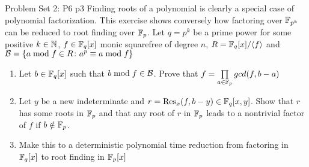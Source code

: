 \documentclass[a4paper, 11pt]{article}
\begin{document}
\begin{problem}{%
		Problem Set 2: P6
	}{p3%
	}
	Finding roots of a polynomial is clearly a special case of polynomial factorization. This exercise
	shows conversely how factoring over $\mathbb{F}_{p^k}$ can be reduced to root finding over $\mathbb{F}_p$. Let $q=p^k$ be a prime power for some positive $k\in \mathbb{N}$, $f\in \mathbb{F}_q[x]$ monic squarefree of degree $n$, $R=\mathbb{F}_q[x]/\langle f\rangle$ and $\mathcal{B}=\{a\bmod f\in R\colon a^p\equiv a\bmod f\}$
	\begin{enumerate}[label=(\alph*)]
		\item Let $b\in \mathbb{F}_q[x]$ such that $b\bmod f\in\mathcal{B}$. Prove that $f=\prod\limits_{a\in \mathbb{F}_p}gcd(f,b-a)$
		\item Let $y$ be a new indeterminate and $r=\operatorname{Res}_x(f,b-y)\in \mathbb{F}_q[x,y]$. Show that $r$ has some roots in $\mathbb{F}_p$ and that any root of $r$ in $\mathbb{F}_p$ leads to a nontrivial factor of $f$ if $b\notin \mathbb{F}_p$.
		\item Make this to a deterministic polynomial time reduction from factoring in $\mathbb{F}_q[x]$ to root finding in $\mathbb{F}_p[x]$
	\end{enumerate}
\end{problem}
\end{document}
